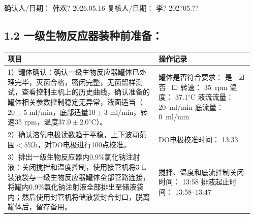 \documentclass[UTF8,10pt,a4paper,fontset=fandol]{ctexart}
\newcommand{\fieldvalue}[1]{#1}
\newcommand{\handwritten}[1]{#1}
\newcommand{\checkboxfield}[1]{\ifstrequal{#1}{checked}{☑}{\ifstrequal{#1}{unclear}{?}{☐}}}
\begin{document}
\noindent
确认人/日期：%
\fieldvalue{\handwritten{韩欢?}}\quad
\fieldvalue{\handwritten{2026.05.16}}
\hfill
复核人/日期：%
\fieldvalue{\handwritten{李?}}\quad
\fieldvalue{\handwritten{202?05.??}}

\subsection*{1.2 一级生物反应器装种前准备：}

\begin{center}
\small
\begin{tabular}{|p{0.59\linewidth}|p{0.37\linewidth}|}
\hline
项目 & 操作记录\\
\hline
1）罐体确认：确认一级生物反应器罐体已处理完毕，灭菌合格，密闭完整，无菌留样测试，查看控制主机上的历史曲线，确认准备的罐体相关参数控制稳定无异常，液面适当（$20\pm5$ ml/min，底部适量$10\pm3$ ml/min，转速35 rpm，温度$37.0\pm2.0^\circ$C）。 &
罐体是否符合要求：\newline
是\ 
\fieldvalue{\checkboxfield{checked}}
\quad 否\ 
\fieldvalue{\checkboxfield{unchecked}}\newline
转速：%
\fieldvalue{\handwritten{35}}\ rpm\newline
温度：%
\fieldvalue{\handwritten{37.1}}$^\circ$C\newline
液流流量：%
\fieldvalue{\handwritten{20}}\ ml/min\newline
底流量：%
\fieldvalue{\handwritten{0}}\ ml/min\\
\hline
2）确认溶氧电极读数趋于平稳，上下波动范围$<5\%$h，对DO电极进行100点校准。 &
DO电极校准时间：%
\fieldvalue{\handwritten{13:33}}\\
\hline
3）排出一级生物反应器内0.9\%氯化钠注射液：关闭搅拌和温度控制，使用接管机将3 L装液袋与一级生物反应器罐体全部管路连接，将罐内0.9\%氯化钠注射液全部排出至储液袋内；然后使用封管机将储液袋封合封口，脱离罐体后，留存备用。 &
搅拌、温度和底流控制关闭时间：\newline
\fieldvalue{\handwritten{13:58}}\newline
排液起止时间：%
\fieldvalue{\handwritten{13:58--13:47}}\\
\hline
\end{tabular}
\end{center}
\end{document}
